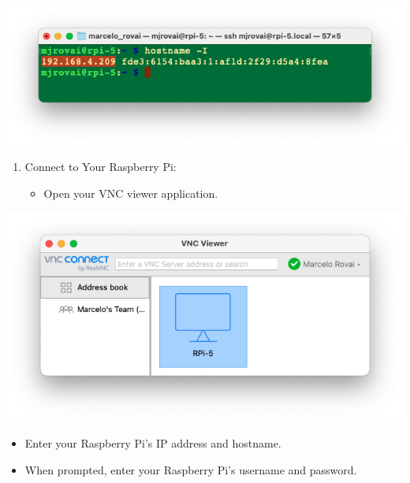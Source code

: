 \documentclass[
]{article}
\providecommand{\tightlist}{%
  \setlength{\itemsep}{0pt}\setlength{\parskip}{0pt}}\usepackage{longtable,booktabs,array}
\begin{document}
\noindent \begin{center}
\includegraphics[width=0.85\linewidth,height=\textheight,keepaspectratio]{images/png/vnc-4.png}
\end{center}

\begin{enumerate}
\def\labelenumi{\arabic{enumi}.}
\setcounter{enumi}{3}
\tightlist
\item
  Connect to Your Raspberry Pi:

  \begin{itemize}
  \tightlist
  \item
    Open your VNC viewer application.
  \end{itemize}
\end{enumerate}

\noindent \begin{center}
\includegraphics[width=0.85\linewidth,height=\textheight,keepaspectratio]{images/png/vnc-5.png}
\end{center}

\begin{itemize}
\tightlist
\item
  Enter your Raspberry Pi's IP address and hostname.
\item
  When prompted, enter your Raspberry Pi's username and password.
\end{itemize}
\end{document}
